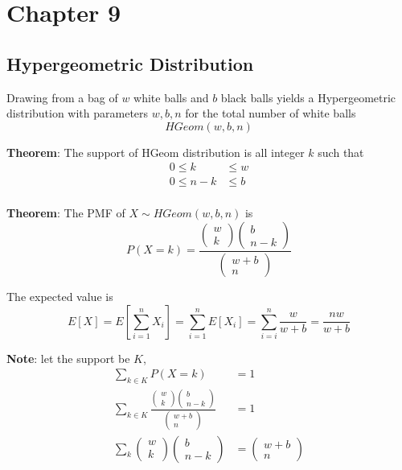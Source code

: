 \chapter{Chapter 9}

\section{Hypergeometric Distribution}

\begin{framed}

   Drawing from a bag of $w$ white balls and $b$ black balls yields a Hypergeometric distribution with parameters $w, b, n$ for the total number of white balls
   \[
     HGeom(w, b, n)
   \] 

   \textbf{Theorem}: The support of HGeom distribution is all integer $k$ such that
   \begin{align*}
      0 \leq k & \leq w \\
      0 \leq n-k & \leq b \\
   \end{align*}

   \textbf{Theorem}: The PMF of $X \sim HGeom(w, b, n)$ is
    \[
     P(X = k) = \frac{ \begin{pmatrix} w \\ k  \end{pmatrix} \begin{pmatrix}  b \\ n-k \end{pmatrix} }{ \begin{pmatrix}  w + b \\ n \end{pmatrix} }
   \] 

   The expected value is 
   \[
      E[X] = E \left[ \sum_{i = 1}^{n} X_i\right] = \sum_{i = 1}^{n} E[X_i] = \sum_{i = i}^{n} \frac{w}{w + b} = \frac{nw}{ w + b}
   \] 


   \textbf{Note}: let the support be $K$,
   \begin{align*}
      \sum_{k \in K} P(X = k)  & = 1\\
      \sum_{k \in K} \frac{ \begin{pmatrix}  w \\ k \end{pmatrix}  \begin{pmatrix}  b \\ n-k \end{pmatrix} }{ \begin{pmatrix}  w + b \\ n \end{pmatrix} } &= 1\\
      \sum_{k} \begin{pmatrix}  w \\ k \end{pmatrix}  \begin{pmatrix}  b \\ n - k  \end{pmatrix}  &= \begin{pmatrix}  w + b \\ n \end{pmatrix} 
   \end{align*}
\end{framed}








